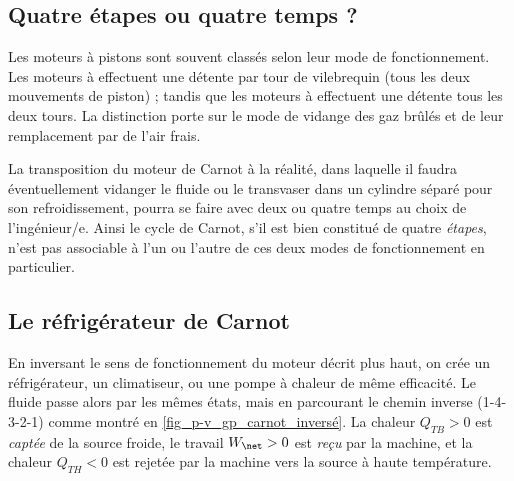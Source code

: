 \begin{anexample}
		\end{anexample}
		

	\subsection{Quatre étapes ou quatre temps ?}
	
		Les moteurs à pistons sont souvent classés selon leur mode de fonctionnement. Les moteurs à  effectuent une détente par tour de vilebrequin (tous les deux mouvements de piston) ; tandis que les moteurs à  effectuent une détente tous les deux tours. La distinction porte sur le mode de vidange des gaz brûlés et de leur remplacement par de l’air frais.
		
		La transposition du moteur de Carnot à la réalité, dans laquelle il faudra éventuellement vidanger le fluide ou le transvaser dans un cylindre séparé pour son refroidissement, pourra se faire avec deux ou quatre temps au choix de l’ingénieur/e. Ainsi le cycle de Carnot, s’il est bien constitué de quatre \emph{étapes}, n’est pas associable à l’un ou l’autre de ces deux modes de fonctionnement en particulier.
		

	\subsection{Le réfrigérateur de Carnot}

		En inversant le sens de fonctionnement du moteur décrit plus haut, on crée un réfrigérateur, un climatiseur, ou une pompe à chaleur de même efficacité. Le fluide passe alors par les mêmes états, mais en parcourant le chemin inverse (1-4-3-2-1) comme montré en \cref{fig_p-v_gp_carnot_inversé}. La chaleur $Q_{TB} > 0$ est \emph{captée} de la source froide, le travail $W_\net > 0$ est \emph{reçu} par la machine, et la chaleur $Q_{TH} < 0$ est rejetée par la machine vers la source à haute température.

